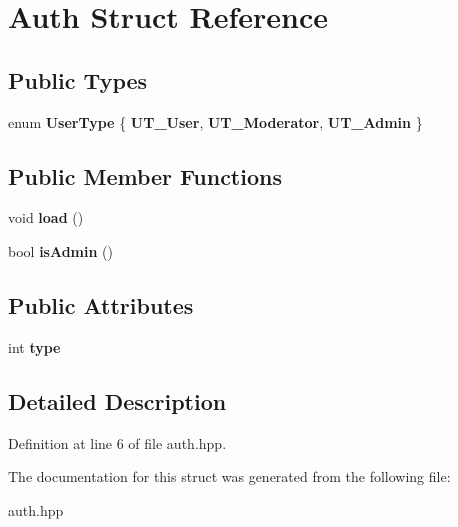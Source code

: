 \hypertarget{struct_auth}{\section{Auth Struct Reference}
\label{struct_auth}
}
\subsection*{Public Types}
\begin{DoxyCompactItemize}
\item 
enum {\bfseries User\-Type} \{ {\bfseries U\-T\-\_\-\-User}, 
{\bfseries U\-T\-\_\-\-Moderator}, 
{\bfseries U\-T\-\_\-\-Admin}
 \}
\end{DoxyCompactItemize}
\subsection*{Public Member Functions}
\begin{DoxyCompactItemize}
\item 
\hypertarget{struct_auth_a3b2f96c60a4e4ac237009a9b53517e16}{void {\bfseries load} ()}\label{struct_auth_a3b2f96c60a4e4ac237009a9b53517e16}

\item 
\hypertarget{struct_auth_a3c3563b2855ffc510717eabc03e89278}{bool {\bfseries is\-Admin} ()}\label{struct_auth_a3c3563b2855ffc510717eabc03e89278}

\end{DoxyCompactItemize}
\subsection*{Public Attributes}
\begin{DoxyCompactItemize}
\item 
\hypertarget{struct_auth_a0ba4018434597c9cdb89906d28de6e20}{int {\bfseries type}}\label{struct_auth_a0ba4018434597c9cdb89906d28de6e20}

\end{DoxyCompactItemize}


\subsection{Detailed Description}


Definition at line 6 of file auth.\-hpp.



The documentation for this struct was generated from the following file\-:\begin{DoxyCompactItemize}
\item 
auth.\-hpp\end{DoxyCompactItemize}
